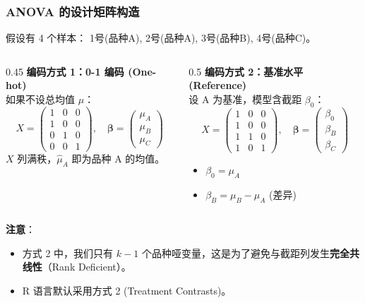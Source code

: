 
\begin{frame}[fragile]
\frametitle{ANOVA 的设计矩阵构造}

假设有 4 个样本：
1号(品种A), 2号(品种A), 3号(品种B), 4号(品种C)。

\begin{columns}[T]
\begin{column}{0.45\textwidth}
\textbf{编码方式 1：0-1 编码 (One-hot)} \\
如果不设总均值 $\mu$：
\[
X = \begin{pmatrix}
1 & 0 & 0 \\
1 & 0 & 0 \\
0 & 1 & 0 \\
0 & 0 & 1
\end{pmatrix},\quad
\boldsymbol{\beta} = \begin{pmatrix} \mu_A \\ \mu_B \\ \mu_C \end{pmatrix}
\]
$X$ 列满秩，$\hat{\mu}_A$ 即为品种 A 的均值。
\end{column}
\begin{column}{0.5\textwidth}
\textbf{编码方式 2：基准水平 (Reference)} \\
设 A 为基准，模型含截距 $\beta_0$：
\[
X = \begin{pmatrix}
1 & 0 & 0 \\
1 & 0 & 0 \\
1 & 1 & 0 \\
1 & 0 & 1
\end{pmatrix},\quad
\boldsymbol{\beta} = \begin{pmatrix} \beta_0 \\ \beta_{B} \\ \beta_{C} \end{pmatrix}
\]
\begin{itemize}
    \item $\beta_0 = \mu_A$
    \item $\beta_B = \mu_B - \mu_A$ (差异)
\end{itemize}
\end{column}
\end{columns}

\vspace{1em}
\textbf{注意}：
\begin{itemize}
    \item 方式 2 中，我们只有 $k-1$ 个品种哑变量，这是为了避免与截距列发生\textbf{完全共线性}（Rank Deficient）。
    \item R 语言默认采用方式 2 (Treatment Contrasts)。
\end{itemize}
\end{frame}

